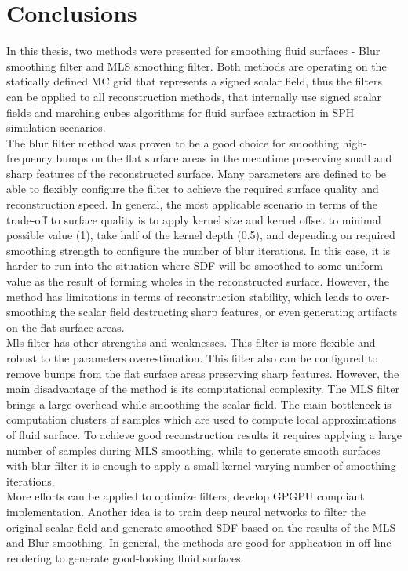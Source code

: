 \chapter{Conclusions}
In this thesis, two methods were presented for smoothing fluid surfaces - Blur smoothing filter and MLS smoothing filter. Both methods are operating on the statically defined MC grid that represents a signed scalar field, thus the filters can be applied to all reconstruction methods, that internally use signed scalar fields and marching cubes algorithms for fluid surface extraction in SPH simulation scenarios.\\
The blur filter method was proven to be a good choice for smoothing high-frequency bumps on the flat surface areas in the meantime preserving small and sharp features of the reconstructed surface. Many parameters are defined to be able to flexibly configure the filter to achieve the required surface quality and reconstruction speed. In general, the most applicable scenario in terms of the trade-off to surface quality is to apply kernel size and kernel offset to minimal possible value (1), take half of the kernel depth (0.5), and depending on required smoothing strength to configure the number of blur iterations. In this case, it is harder to run into the situation where SDF will be smoothed to some uniform value as the result of forming wholes in the reconstructed surface.
However, the method has limitations in terms of reconstruction stability, which leads to over-smoothing the scalar field destructing sharp features, or even generating artifacts on the flat surface areas.\\
Mls filter has other strengths and weaknesses. This filter is more flexible and robust to the parameters overestimation. This filter also can be configured to remove bumps from the flat surface areas preserving sharp features. However, the main disadvantage of the method is its computational complexity. The MLS filter brings a large overhead while smoothing the scalar field. The main bottleneck is computation clusters of samples which are used to compute local approximations of fluid surface. To achieve good reconstruction results it requires applying a large number of samples during MLS smoothing, while to generate smooth surfaces with blur filter it is enough to apply a small kernel varying number of smoothing iterations.\\
More efforts can be applied to optimize filters, develop GPGPU compliant implementation. Another idea is to train deep neural networks to filter the original scalar field and generate smoothed SDF based on the results of the MLS and Blur smoothing. In general, the methods are good for application in off-line rendering to generate good-looking fluid surfaces.